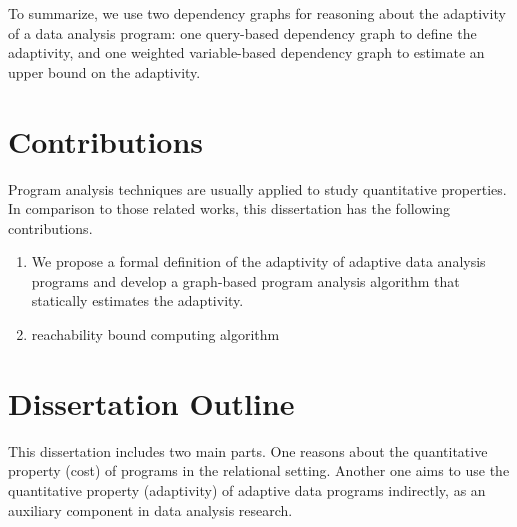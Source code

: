 {To summarize, we use two dependency graphs for reasoning about the adaptivity of a data analysis program: 
one query-based dependency graph to define the adaptivity, and one weighted variable-based dependency graph to estimate an upper bound on the adaptivity. }

\section{Contributions}

Program analysis techniques are usually applied to study quantitative properties. In comparison to those related works, this dissertation has the following contributions.

\begin{enumerate}

\item We propose a formal definition of the adaptivity of adaptive data analysis programs and develop a graph-based program analysis algorithm that statically estimates the adaptivity.
\item reachability bound computing algorithm
\end{enumerate}

\section{Dissertation Outline}
This dissertation includes two main parts. 
One reasons about the quantitative property (cost) of programs in the relational setting. Another one aims to use the quantitative property (adaptivity) of adaptive data programs indirectly, as an auxiliary component in data analysis research.

